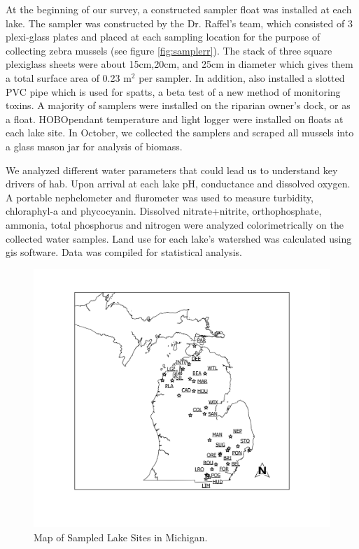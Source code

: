 At the beginning of our survey, a constructed sampler float was installed at each lake. The sampler was constructed by the Dr. Raffel's team, which consisted of 3 plexi-glass plates and placed at each sampling location for the purpose of collecting zebra mussels (see figure \ref{fig:samplerr}). The stack of three square plexiglass sheets were about 15cm,20cm, and 25cm in diameter which gives them a total surface area of 0.23 m$^2$ per sampler. In addition, also installed a slotted PVC pipe which is used for \gls{spatts}, a beta test of a new method of monitoring toxins. A majority of samplers were installed on the riparian owner's dock, or as a float. HOBO\texttrademark pendant temperature and light logger were installed on floats at each lake site. In October, we collected the samplers and scraped all mussels into a glass mason jar for analysis of biomass.

We analyzed different water parameters that could lead us to understand key drivers of \gls{hab}. Upon arrival at each lake pH, conductance and dissolved oxygen. A portable nephelometer and flurometer was used to measure turbidity, chloraphyl-a and phycocyanin. Dissolved nitrate+nitrite, orthophosphate, ammonia, total phosphorus and nitrogen were analyzed colorimetrically on the collected water samples. Land use for each lake's watershed was calculated using \gls{gis} software. Data was compiled for statistical analysis.

\begin{figure}[!h]
\includegraphics[width=\textwidth]{figures/Overview}
\caption{Map of Sampled Lake Sites in Michigan.}
\label{fig:overview}
\end{figure}

